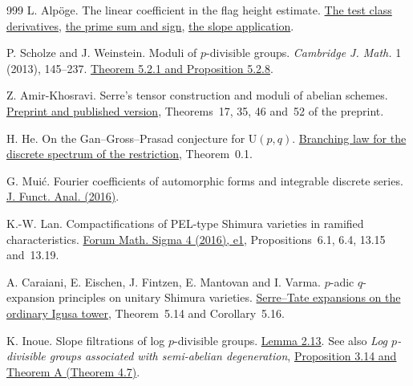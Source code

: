 \documentclass[11pt]{article}
\theoremstyle{definition}
\theoremstyle{plain}
\begin{document}
\begin{thebibliography}{999}
 L. Alp\"oge. The linear coefficient in the flag height estimate.
\href{https://github.com/TomasOrtega/RH/blob/a6ac91a412dcbaab31801355ec5707024a71bf65/extracted/lean/src/Development/AbelianVarietyTheory/Proofs/DivisorProofs/CurveClassDegreeComputations.lean}{The test class derivatives},
\href{https://github.com/TomasOrtega/RH/blob/a6ac91a412dcbaab31801355ec5707024a71bf65/extracted/lean/src/Development/AbelianVarietyTheory/Proofs/DivisorProofs/LowerBoundLinearCoefficient.lean}{the prime sum and sign},
\href{https://github.com/TomasOrtega/RH/blob/a6ac91a412dcbaab31801355ec5707024a71bf65/extracted/lean/src/Development/AbelianVarietyTheory/Proofs/DivisorProofs/VolumeEqualitySlopeMean.lean}{the slope application}.

 P. Scholze and J. Weinstein.
Moduli of \(p\)-divisible groups. \emph{Cambridge J. Math.} 1 (2013),
145--237. \href{https://people.mpim-bonn.mpg.de/scholze/Moduli.pdf}{Theorem 5.2.1 and Proposition 5.2.8}.

 Z. Amir-Khosravi.
Serre's tensor construction and moduli of abelian schemes.
\href{https://arxiv.org/abs/1507.07607}{Preprint and published version},
Theorems~17, 35, 46 and~52 of the preprint.

 H. He.
On the Gan--Gross--Prasad conjecture for \(\mathrm U(p,q)\).
\href{https://arxiv.org/abs/1508.02032}{Branching law for the discrete spectrum of the restriction}, Theorem~0.1.

 G. Mui\'c.
Fourier coefficients of automorphic forms and integrable discrete series.
\href{https://www.sciencedirect.com/science/article/pii/S0022123616001075}{J. Funct. Anal. (2016)}.


 K.-W. Lan.
Compactifications of PEL-type Shimura varieties in ramified characteristics.
\href{https://doi.org/10.1017/fms.2015.31}{Forum Math. Sigma 4 (2016), e1},
Propositions~6.1, 6.4, 13.15 and~13.19.

 A. Caraiani, E. Eischen, J. Fintzen, E. Mantovan and I. Varma.
\(p\)-adic \(q\)-expansion principles on unitary Shimura varieties.
\href{https://arxiv.org/abs/1411.4350}{Serre--Tate expansions on the ordinary Igusa tower},
Theorem~5.14 and Corollary~5.16.

 K. Inoue.
Slope filtrations of log \(p\)-divisible groups.
\href{https://doi.org/10.1017/nmj.2026.10106}{Lemma 2.13}.
See also \emph{Log \(p\)-divisible groups associated with semi-abelian degeneration},
\href{https://arxiv.org/abs/2505.03993v2}{Proposition 3.14 and Theorem A (Theorem 4.7)}.


\end{thebibliography}
\end{document}
